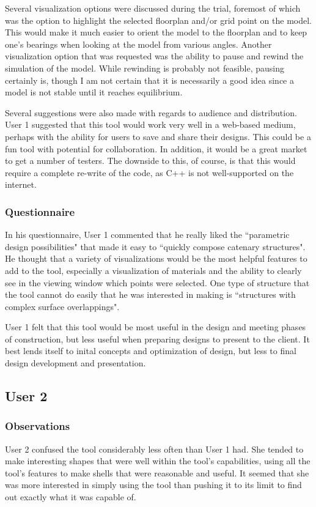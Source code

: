 \documentclass{thesis}
\begin{document}
Several visualization options were discussed during the trial, foremost of which was the option to highlight the selected floorplan
and/or grid point on the model.  This would make it much easier to orient the model to the floorplan and to keep one's bearings
when looking at the model from various angles.  Another visualization option that was requested was the ability to pause and rewind
the simulation of the model.  While rewinding is probably not feasible, pausing certainly is, though I am not certain that it is
necessarily a good idea since a model is not stable until it reaches equilibrium.

Several suggestions were also made with regards to audience and distribution.  User 1 suggested that this tool would work very well in
a web-based medium, perhaps with the ability for users to save and share their designs.  This could be a fun tool with potential for
collaboration.  In addition, it would be a great market to get a number of testers.  The downside to this, of course, is that this
would require a complete re-write of the code, as C++ is not well-supported on the internet.

\subsubsection{Questionnaire}
In his questionnaire, User 1 commented that he really liked the ``parametric design possibilities" that made it easy to ``quickly compose
catenary structures".  He thought that a variety of visualizations would be the most helpful features to add to the tool, especially
a visualization of materials and the ability to clearly see in the viewing window which points were selected.  One type of structure
that the tool cannot do easily that he was interested in making is ``structures with complex surface overlappings".

User 1 felt that this tool would be most useful in the design and meeting phases of construction, but less useful when preparing
designs to present to the client.  It best lends itself to inital concepts and optimization of design, but less to final design
development and presentation.

\subsection{User 2}
\subsubsection{Observations}
User 2 confused the tool considerably less often than User 1 had.  She tended to make interesting shapes that were well within the
tool's capabilities, using all the tool's features to make shells that were reasonable and useful.  It seemed that she was more
interested in simply using the tool than pushing it to its limit to find out exactly what it was capable of.
\end{document}
